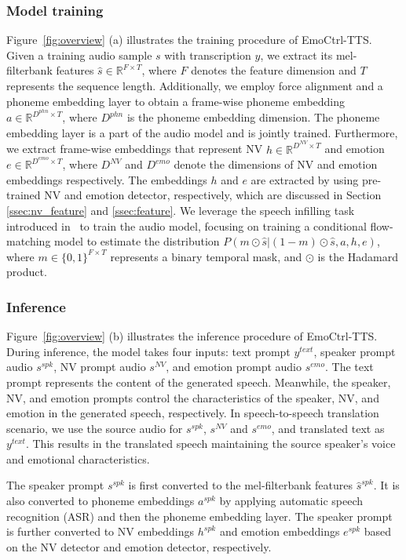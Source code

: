 \subsubsection{Model training}
Figure~\ref{fig:overview} (a) illustrates the training procedure of EmoCtrl-TTS.
Given a training audio sample $s$ with transcription $y$, we extract its mel-filterbank features $\hat{s}\in\mathbb{R}^{F\times T}$, where $F$ denotes the feature dimension and $T$ represents the sequence length. 
Additionally, we employ force alignment and a phoneme embedding layer to obtain a frame-wise phoneme embedding $a \in\mathbb{R}^{D^{phn}\times T}$, where $D^{phn}$ is the phoneme embedding dimension. 
The phoneme embedding layer is a part of the audio model and is jointly trained.
Furthermore, we extract frame-wise embeddings that represent
NV  $h \in\mathbb{R}^{D^{NV}\times T}$ and emotion $e \in\mathbb{R}^{D^{emo}\times T}$,
where $D^{NV}$ and $D^{emo}$ denote the dimensions of NV and emotion embeddings respectively.
The embeddings $h$ and $e$ are extracted by using pre-trained NV and emotion detector,
respectively, which are discussed in Section \ref{ssec:nv_feature} and \ref{ssec:feature}.
We leverage the speech infilling task introduced in~\cite{le2024voicebox} to train the audio model, focusing on training a conditional flow-matching model to estimate the distribution $P(m\odot\hat{s}|(1-m)\odot\hat{s},a,h,e)$,
where $m\in\{0,1\}^{F\times T}$ represents a binary temporal mask, and $\odot$ 
is the Hadamard product.

\subsubsection{Inference}
Figure~\ref{fig:overview} (b) illustrates the inference procedure 
of EmoCtrl-TTS.
During inference, the model takes four inputs: 
text prompt $y^{text}$,
speaker prompt audio $s^{spk}$,
NV prompt audio $s^{NV}$, 
and emotion prompt audio $s^{emo}$.
The text prompt represents the content of the generated speech. Meanwhile, the speaker, 
NV, and emotion prompts control the characteristics of the speaker, NV, and emotion in the generated speech, respectively.
In speech-to-speech translation scenario, we use the source audio 
for $s^{spk}$, $s^{NV}$ and $s^{emo}$, and
translated text as $y^{text}$.
This results in the translated speech maintaining the source speaker’s voice and emotional characteristics.

The speaker prompt $s^{spk}$ is first converted to the mel-filterbank features $\hat{s}^{spk}$. It is also converted to phoneme embeddings $a^{spk}$ by applying automatic speech recognition (ASR) and then the phoneme embedding layer. The speaker prompt is further converted to NV embeddings $h^{spk}$ and emotion embeddings $e^{spk}$ based on the NV detector and emotion detector, respectively.

